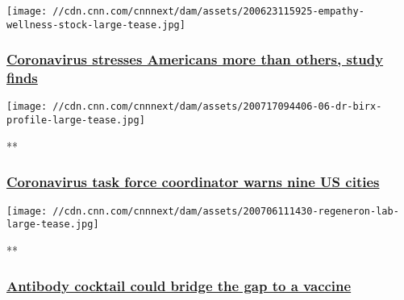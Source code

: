 \href{/2020/08/06/health/us-coronavirus-mental-health-problems-wellness/index.html}{}

\texttt{[image: //cdn.cnn.com/cnnnext/dam/assets/200623115925-empathy-wellness-stock-large-tease.jpg]}

\hypertarget{coronavirus-stresses-americans-more-than-others-study-finds-1}{%
\subsubsection{\texorpdfstring{\href{/2020/08/06/health/us-coronavirus-mental-health-problems-wellness/index.html}{Coronavirus
stresses Americans more than others, study
finds}}{Coronavirus stresses Americans more than others, study finds}}\label{coronavirus-stresses-americans-more-than-others-study-finds-1}}

\href{/videos/health/2020/08/06/coronavirus-warning-nine-us-cities-athena-jones-pkg-lead-vpx.cnn}{}

\texttt{[image: //cdn.cnn.com/cnnnext/dam/assets/200717094406-06-dr-birx-profile-large-tease.jpg]}

**

\hypertarget{coronavirus-task-force-coordinator-warns-nine-us-cities}{%
\subsubsection{\texorpdfstring{\href{/videos/health/2020/08/06/coronavirus-warning-nine-us-cities-athena-jones-pkg-lead-vpx.cnn}{Coronavirus
task force coordinator warns nine US
cities}}{Coronavirus task force coordinator warns nine US cities}}\label{coronavirus-task-force-coordinator-warns-nine-us-cities}}

\href{/videos/health/2020/08/06/coronavirus-antibody-treatment-regeneron-cohen-vpx.cnn}{}

\texttt{[image: //cdn.cnn.com/cnnnext/dam/assets/200706111430-regeneron-lab-large-tease.jpg]}

**

\hypertarget{antibody-cocktail-could-bridge-the-gap-to-a-vaccine}{%
\subsubsection{\texorpdfstring{\href{/videos/health/2020/08/06/coronavirus-antibody-treatment-regeneron-cohen-vpx.cnn}{Antibody
cocktail could bridge the gap to a
vaccine}}{Antibody cocktail could bridge the gap to a vaccine}}\label{antibody-cocktail-could-bridge-the-gap-to-a-vaccine}}

